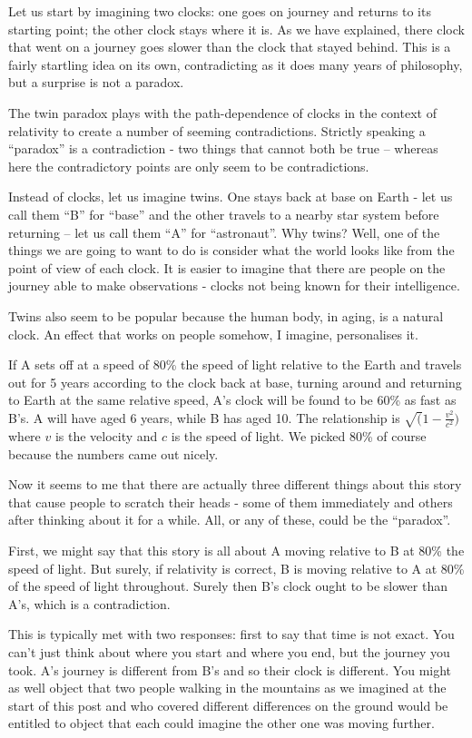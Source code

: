 \documentclass[a4paper]{report}
\begin{document}
Let us start by imagining two clocks: one goes on journey and returns to its starting point; the other clock stays where it is. As we have explained, there clock that went on a journey goes slower than the clock that stayed behind. This is a fairly startling idea on its own, contradicting as it does many years of philosophy, but a surprise is not a paradox.

The twin paradox plays with the path-dependence of clocks in the context of relativity to create a number of seeming contradictions. Strictly speaking a ``paradox'' is a contradiction - two things that cannot both be true -- whereas here the contradictory points are only seem to be contradictions.

Instead of clocks, let us imagine twins. One stays back at base on Earth - let us call them ``B'' for ``base'' and the other travels to a nearby star system before returning -- let us call them ``A'' for ``astronaut''. Why twins? Well, one of the things we are going to want to do is consider what the world looks like from the point of view of each clock. It is easier to imagine that there are people on the journey able to make observations - clocks not being known for their intelligence.

Twins also seem to be popular because the human body, in aging, is a natural clock. An effect that works on people somehow, I imagine, personalises it.

If A sets off at a speed of 80\% the speed of light relative to the Earth and travels out for 5 years according to the clock back at base, turning around and returning to Earth at the same relative speed, A's clock will be found to be 60\% as fast as B's. A will have aged 6 years, while B has aged 10. The relationship is $\sqrt(1 - \frac{v^2}{c^2})$ where $v$ is the velocity and $c$ is the speed of light. We picked 80\% of course because the numbers came out nicely.

Now it seems to me that there are actually three different things about this story that cause people to scratch their heads - some of them immediately and others after thinking about it for a while. All, or any of these, could be the ``paradox''.

First, we might say that this story is all about A moving relative to B at 80\% the speed of light. But surely, if relativity is correct, B is moving relative to A at 80\% of the speed of light throughout. Surely then B's clock ought to be slower than A's, which is a contradiction.

This is typically met with two responses: first to say that time is not exact. You can't just think about where you start and where you end, but the journey you took. A's journey is different from B's and so their clock is different. You might as well object that two people walking in the mountains as we imagined at the start of this post and who covered different differences on the ground would be entitled to object that each could imagine the other one was moving further.
\end{document}
